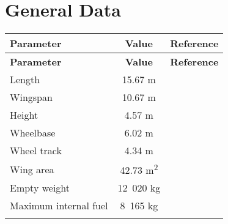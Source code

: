 \section{General Data}

\begin{tabularx}{\textwidth}{ | L | c | c | }
  \hline
  \textbf{Parameter}                    & \textbf{Value}   & \textbf{Reference} \\ \hline
  \endfirsthead
  \hline
  \textbf{Parameter}                    & \textbf{Value}   & \textbf{Reference} \\ \hline
  \endhead
  Length                                & 15.67 m          & \cite{Janes20072008} \\ \hline
  Wingspan                              & 10.67 m          & \cite{Janes20072008} \\ \hline
  Height                                & 4.57 m           & \cite{Janes20072008} \\ \hline
  Wheelbase                             & 6.02 m           & \cite{Janes20072008} \\ \hline
  Wheel track                           & 4.34 m           & \cite{Janes20072008} \\ \hline
  Wing area                             & 42.73 m\textsuperscript{2} & \cite{Janes20072008} \\ \hline
  Empty weight                          & 12~020 kg        & \cite{Janes20072008} \\ \hline
  Maximum internal fuel                 & 8~165 kg         & \cite{Janes20072008} \\ \hline
  \caption{General Data}
\end{tabularx}
